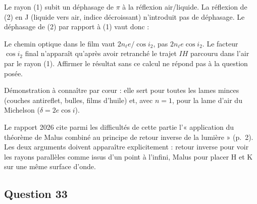 \documentclass[11pt,a4paper]{article}
\newcommand{\equationajustee}[1]{%
  \sbox{\boiteequation}{$\displaystyle #1$}%
  \ifdim\wd\boiteequation>\linewidth
    \[\resizebox{\linewidth}{!}{\usebox{\boiteequation}}\]%
  \else
    \[#1\]%
  \fi}
\begin{document}
\equationajustee{\begin{aligned}
\delta&=\frac{2n_\ell e}{\cos i_2}\left(1-\sin^2i_2\right)\\
&=2n_\ell e\cos i_2
\end{aligned}}

Le rayon (1) subit un déphasage de \(\pi\) à la réflexion air/liquide. La réflexion de (2) en J (liquide vers air, indice décroissant) n'introduit pas de déphasage. Le déphasage de (2) par rapport à (1) vaut donc :

\equationajustee{\begin{aligned}
\varphi&=\frac{2\pi\delta}\lambda-\pi\\
&=\frac\alpha\lambda\cos i_2-\pi
\end{aligned}}

\equationajustee{\boxed{\alpha=4\pi n_\ell e}}

\begin{piege}

Le chemin optique dans le film vaut \(2n_\ell e/\cos i_2\), pas \(2n_\ell e\cos i_2\). Le facteur \(\cos i_2\) final n'apparaît qu'après avoir retranché le trajet \(IH\) parcouru dans l'air par le rayon (1). Affirmer le résultat sans ce calcul ne répond pas à la question posée.

\end{piege}

\begin{methode}

Démonstration à connaître par cœur : elle sert pour toutes les lames minces (couches antireflet, bulles, films d'huile) et, avec \(n=1\), pour la lame d'air du Michelson (\(\delta=2e\cos i\)).

\end{methode}

\begin{jury}

Le rapport 2026 cite parmi les difficultés de cette partie l'« application du théorème de Malus combiné au principe de retour inverse de la lumière » (p.~2). Les deux arguments doivent apparaître explicitement : retour inverse pour voir les rayons parallèles comme issus d'un point à l'infini, Malus pour placer H et K sur une même surface d'onde.

\end{jury}

\hypertarget{question-33}{%
\subsection{Question 33}\label{question-33}}
\end{document}
